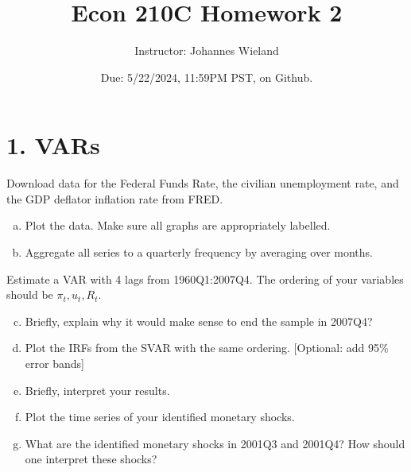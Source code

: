 \documentclass{article}
\newcommand{\1}{\mathbf{1}}
\begin{document}
\title{Econ 210C Homework 2}
\author{Instructor: Johannes Wieland}
\date{\color{red} Due: 5/22/2024, 11:59PM PST, on Github.}
\maketitle



\section*{1. VARs}
Download data for the Federal Funds Rate, the civilian unemployment rate, and the GDP deflator inflation rate from FRED.
\begin{enumerate}[(a)]
	\item Plot the data. Make sure all graphs are appropriately labelled.
	\item Aggregate all series to a quarterly frequency by averaging over months.
\end{enumerate}
Estimate a VAR with 4 lags from 1960Q1:2007Q4. The ordering of your variables should be $\pi_t,u_t,R_t$.
\begin{enumerate}[(a)]\setcounter{enumi}{2}
	\item Briefly, explain why it would make sense to end the sample in 2007Q4?
	\item Plot the IRFs from the SVAR with the same ordering. [Optional: add 95\% error bands]
	\item Briefly, interpret your results.
	\item Plot the time series of your identified monetary shocks.
	\item What are the identified monetary shocks in 2001Q3 and 2001Q4? How should one interpret these shocks?
\end{enumerate}
\end{document}
